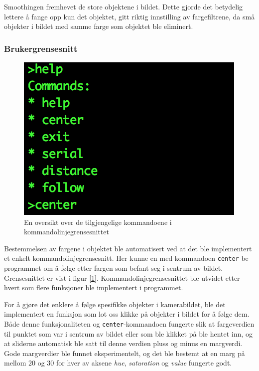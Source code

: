 Smoothingen fremhevet de store objektene i bildet. Dette gjorde det betydelig lettere å fange opp kun det objektet, gitt riktig innstilling av fargefiltrene, da små objekter i bildet med samme farge som objektet ble eliminert.

\subsubsection{Brukergrensesnitt}

\begin{figure}
	\centering
	\includegraphics[width=\linewidth]{img/command-menu.png}
	\caption{En oversikt over de tilgjengelige kommandoene i kommandolinjegrensesnittet}
	\label{fig:commandmenu}
\end{figure}

Bestemmelsen av fargene i objektet ble automatisert ved at det ble implementert et enkelt kommandolinjegrensesnitt. Her kunne en med kommandoen \texttt{center} be programmet om å følge etter fargen som befant seg i sentrum av bildet. Grensesnittet er vist i figur [\ref{fig:commandmenu}]. Kommandolinjegrensesnittet ble utvidet etter hvert som flere funksjoner ble implementert i programmet.

For å gjøre det enklere å følge spesifikke objekter i kamerabildet, ble det implementert en funksjon som lot oss klikke på objekter i bildet for å følge dem. Både denne funksjonaliteten og \texttt{center}-kommandoen fungerte slik at fargeverdien til punktet som var i sentrum av bildet eller som ble klikket på ble hentet inn, og at sliderne automatisk ble satt til denne verdien pluss og minus en margverdi. Gode margverdier ble funnet eksperimentelt, og det ble bestemt at en marg på mellom $20$ og $30$ for hver av aksene \emph{hue}, \emph{saturation} og \emph{value} fungerte godt.

